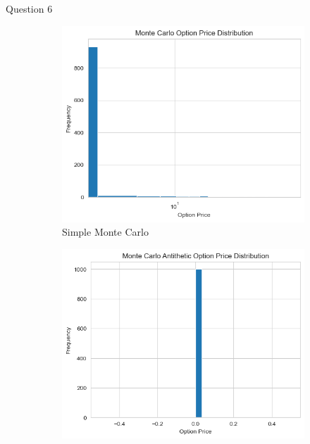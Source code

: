 \documentclass[compress,12pt]{beamer}
\begin{document}
\begin{frame}{Question 6}
      \begin{figure}
            \centering
            \begin{subfigure}{0.4\textwidth}
                  \centering
                  \includegraphics[scale=0.3]{./imgs/mc1.png}
                  \caption{Simple Monte Carlo}
            \end{subfigure}
            \begin{subfigure}{0.4\textwidth}
                  \centering
                  \includegraphics[scale=0.3]{./imgs/mcantithetic.png}

\end{subfigure}
\end{figure}
\end{frame}
\end{document}
